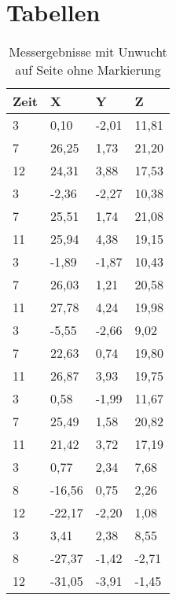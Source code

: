 \section{Tabellen}
\begin{table}[H]
\centering
\begin{tabular}{llll}
\textbf{Zeit} & \textbf{X} & \textbf{Y } & \textbf{Z} \\
\hline
\hline
3    & 0,10   & -2,01 & 11,81 \\
7    & 26,25  & 1,73  & 21,20 \\
12   & 24,31  & 3,88  & 17,53 \\
\hline
3    & -2,36  & -2,27 & 10,38 \\
7    & 25,51  & 1,74  & 21,08 \\
11   & 25,94  & 4,38  & 19,15 \\
\hline
3    & -1,89  & -1,87 & 10,43 \\
7    & 26,03  & 1,21  & 20,58 \\
11   & 27,78  & 4,24  & 19,98 \\
\hline
3    & -5,55  & -2,66 & 9,02  \\
7    & 22,63  & 0,74  & 19,80 \\
11   & 26,87  & 3,93  & 19,75 \\
\hline
3    & 0,58   & -1,99 & 11,67 \\
7    & 25,49  & 1,58  & 20,82 \\
11   & 21,42  & 3,72  & 17,19 \\
\hline
3    & 0,77   & 2,34  & 7,68  \\
8    & -16,56 & 0,75  & 2,26  \\
12   & -22,17 & -2,20 & 1,08  \\
\hline
3    & 3,41   & 2,38  & 8,55  \\
8    & -27,37 & -1,42 & -2,71 \\
12   & -31,05 & -3,91 & -1,45
\end{tabular}
\caption{Messergebnisse mit Unwucht auf Seite ohne Markierung}
\label{tab:imbalance_other_side-full}
\end{table}

